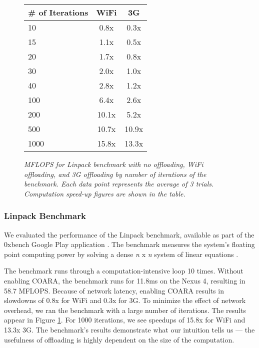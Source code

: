 \documentclass[10pt,journal,cspaper,compsoc]{IEEEtran}
\begin{document}
{\begin{figure}
\centering
{}
\begin{tabular}{|l|c|c|} \hline
\textbf{\# of Iterations}&\textbf{WiFi}&\textbf{3G}\\ \hline
10    &0.8x &0.3x\\ \hline
15    &1.1x &0.5x\\ \hline
20    &1.7x &0.8x\\ \hline
30    &2.0x &1.0x\\ \hline
40    &2.8x &1.2x\\ \hline
100   &6.4x &2.6x\\ \hline
200   &10.1x      &5.2x\\ \hline
500   &10.7x      &10.9x\\ \hline
1000  &15.8x      &13.3x\\
\hline\end{tabular}
\vspace{2 mm}
\caption{\small\textsl{MFLOPS for Linpack benchmark with no offloading, WiFi offloading, and 3G offloading by number of iterations of the benchmark. Each data point represents the average of 3 trials. Computation speed-up figures are shown in the table.}}
\label{fig:benchmark_mflops}
\end{figure}


\subsubsection{Linpack Benchmark}
We evaluated the performance of the Linpack benchmark, available as part of the 0xbench Google Play application \cite{0xbench_linpack:Online}.  The benchmark measures the system's floating point computing power by solving a dense \emph{n} x \emph{n} system of linear equations \cite{0xbench_linpack_wiki:Online}.

The benchmark runs through a computation-intensive loop 10 times. Without enabling COARA, the benchmark runs for 11.8ms on the Nexus 4, resulting in 58.7 MFLOPS. Because of network latency, enabling COARA results in slowdowns of 0.8x for WiFi and 0.3x for 3G.  To minimize the effect of network overhead, we ran the benchmark with a large number of iterations.  The results appear in Figure \ref{fig:benchmark_mflops}.  For 1000 iterations, we see speedups of 15.8x for WiFi and 13.3x 3G.  The benchmark's results demonstrate what our intuition tells us --- the usefulness of offloading is highly dependent on the size of the computation.

}
\end{document}
